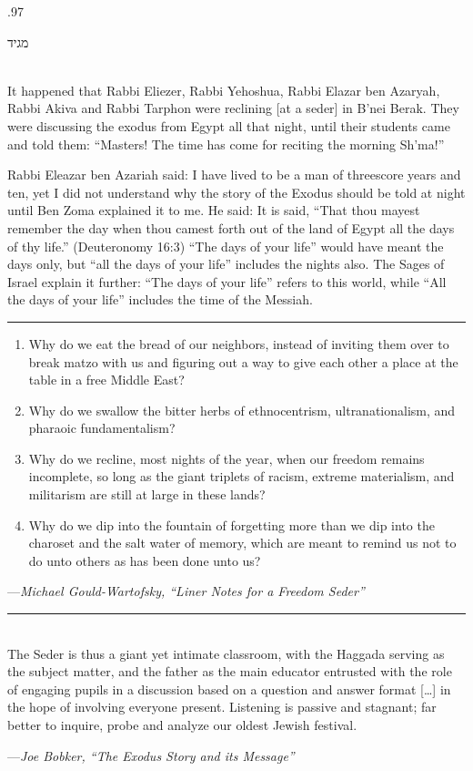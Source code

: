 \documentclass[letter,11pt,openany]{memoir}
\newcommand{\HgSource}[1]{\hfill{\small---\itshape{#1}}}
\newcommand{\hchapter}[1]{ 
\begin{hebrew}
	\begin{Spacing}
		{.97} 
		\newpage \strut
		
		\vspace{.15em}
		\begin{flushleft}
			\noindent\Huge #1 
		\end{flushleft}
		
		\vspace{1em} 
	\end{Spacing}
\end{hebrew}

}
\newcommand{\HgFill}{
\vfill \hrule 
\vfill}
\newenvironment{HgEnglish}{\strut\\
\noindent}{\vspace{1em}}
\newcommand{\LSrc}{\textsuperscript{\upshape{[L]}}}
\begin{document}
\vfill

\hchapter{מגיד}

\vfill
\begin{HgEnglish}
	It happened that Rabbi Eliezer, Rabbi Yehoshua, Rabbi Elazar ben Azaryah, Rabbi Akiva and Rabbi Tarphon were reclining [at a seder] in B'nei Berak. They were discussing the exodus from Egypt all that night, until their students came and told them: ``Masters! The time has come for reciting the morning Sh'ma!''
	
	Rabbi Eleazar ben Azariah said: I have lived to be a man of threescore years and ten, yet I did not understand why the story of the Exodus should be told at night until Ben Zoma explained it to me. He said: It is said, ``That thou mayest remember the day when thou camest forth out of the land of Egypt all the days of thy life.'' (Deuteronomy 16:3) ``The days of your life'' would have meant the days only, but ``all the days of your life'' includes the nights also. The Sages of Israel explain it further: ``The days of your life'' refers to this world, while ``All the days of your life'' includes the time of the Messiah. \LSrc 
\end{HgEnglish}

\HgFill
\begin{enumerate}
	\item Why do we eat the bread of our neighbors, instead of inviting them over to break matzo with us and figuring out a way to give each other a place at the table in a free Middle East?
	
	\item Why do we swallow the bitter herbs of ethnocentrism, ultranationalism, and pharaoic fundamentalism? 
	
	\item Why do we recline, most nights of the year, when our freedom remains incomplete, so long as the giant triplets of racism, extreme materialism, and militarism are still at large in these lands?
	
	\item Why do we dip into the fountain of forgetting more than we dip into the \linebreak charoset and the salt water of memory, which are meant to remind us not to do unto others as has been done unto us? 
\end{enumerate}
\HgSource{Michael Gould-Wartofsky, ``Liner Notes for a Freedom Seder''}\\

\HgFill
\begin{HgEnglish}
	The Seder is thus a giant yet intimate classroom, with the Haggada serving as the subject matter, and the father as the main educator entrusted with the role of engaging pupils in a discussion based on a question and answer format [\ldots] in the hope of involving everyone present. Listening is passive and stagnant; far better to inquire, probe and analyze our oldest Jewish festival.
	
	\HgSource{Joe Bobker, ``The Exodus Story and its Message''} 
\end{HgEnglish}
\end{document}
